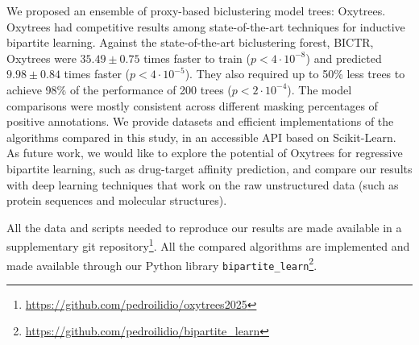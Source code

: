 \documentclass[letterpaper]{article}
\begin{document}
We proposed an ensemble of proxy-based biclustering model trees: Oxytrees.
%
%
Oxytrees had competitive results among state-of-the-art techniques for inductive bipartite learning.
Against the state-of-the-art biclustering forest, BICTR, Oxytrees were $35.49 \pm 0.75$ times faster to train ($p < 4 \cdot 10^{-8}$) and predicted $9.98 \pm 0.84$ times faster ($p < 4 \cdot 10^{-5}$). They also required up to 50\% less trees to achieve 98\% of the performance of 200 trees ($p < 2 \cdot 10^{-4}$).
%
The model comparisons were mostly consistent across different masking percentages of positive annotations.
%
We 
provide datasets and efficient implementations of the algorithms compared in this study, in an accessible API based on Scikit-Learn.
%
%
As future work, we would like to explore the potential of Oxytrees for regressive bipartite learning, such as drug-target affinity prediction, and compare our results with deep learning techniques that work on the raw unstructured data (such as protein sequences and molecular structures).

\FloatBarrier

\iffalse

\label{sec:availability}
All the data and scripts needed to reproduce our results are made available in a supplementary git repository\footnote{\url{https://github.com/pedroilidio/oxytrees2025}}.  
%
All the compared algorithms are implemented and made available through our Python library \texttt{bipartite\_learn}\footnote{\url{https://github.com/pedroilidio/bipartite_learn}}.  
\end{document}
